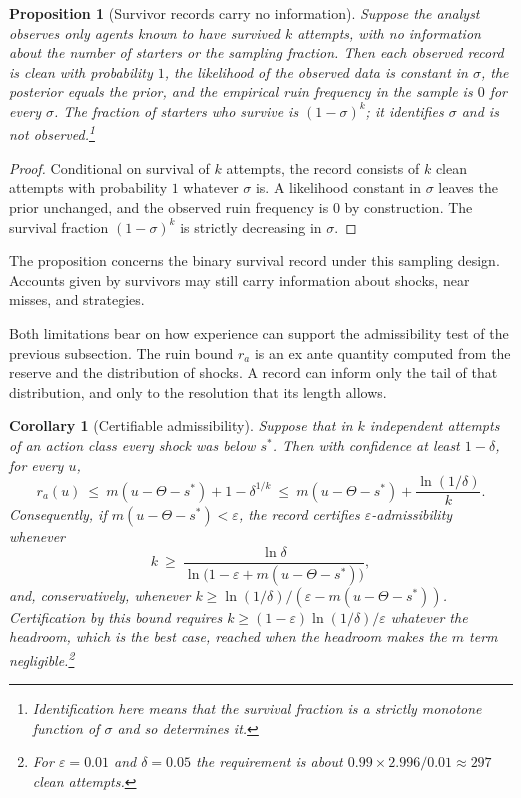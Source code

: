\documentclass[11pt]{article}
\newtheorem{proposition}{Proposition}
\newtheorem{corollary}{Corollary}
\theoremstyle{remark}
\begin{document}
\begin{proposition}[Survivor records carry no information]
Suppose the analyst observes only agents known to have survived $k$ attempts, with no information about the number of starters or the sampling fraction. Then each observed record is clean with probability $1$, the likelihood of the observed data is constant in $\sigma$, the posterior equals the prior, and the empirical ruin frequency in the sample is $0$ for every $\sigma$. The fraction of starters who survive is $(1-\sigma)^k$; it identifies $\sigma$ and is not observed.\footnote{Identification here means that the survival fraction is a strictly monotone function of $\sigma$ and so determines it.}
\end{proposition}

\begin{proof}
Conditional on survival of $k$ attempts, the record consists of $k$ clean attempts with probability $1$ whatever $\sigma$ is. A likelihood constant in $\sigma$ leaves the prior unchanged, and the observed ruin frequency is $0$ by construction. The survival fraction $(1-\sigma)^k$ is strictly decreasing in $\sigma$.
\end{proof}

The proposition concerns the binary survival record under this sampling design. Accounts given by survivors may still carry information about shocks, near misses, and strategies.

Both limitations bear on how experience can support the admissibility test of the previous subsection. The ruin bound $r_a$ is an ex ante quantity computed from the reserve and the distribution of shocks. A record can inform only the tail of that distribution, and only to the resolution that its length allows.

\begin{corollary}[Certifiable admissibility]
Suppose that in $k$ independent attempts of an action class every shock was below $s^\ast$. Then with confidence at least $1-\delta$, for every $u$,
\[
r_a(u)\ \le\ m(u-\Theta-s^\ast)+1-\delta^{1/k}\ \le\ m(u-\Theta-s^\ast)+\frac{\ln(1/\delta)}{k}.
\]
Consequently, if $m(u-\Theta-s^\ast)<\varepsilon$, the record certifies $\varepsilon$-admissibility whenever
\[
k\ \ge\ \frac{\ln\delta}{\ln\bigl(1-\varepsilon+m(u-\Theta-s^\ast)\bigr)},
\]
and, conservatively, whenever $k\ge\ln(1/\delta)/(\varepsilon-m(u-\Theta-s^\ast))$. Certification by this bound requires $k\ge(1-\varepsilon)\ln(1/\delta)/\varepsilon$ whatever the headroom, which is the best case, reached when the headroom makes the $m$ term negligible.\footnote{For $\varepsilon=0.01$ and $\delta=0.05$ the requirement is about $0.99\times2.996/0.01\approx297$ clean attempts.}
\end{corollary}
\end{document}
